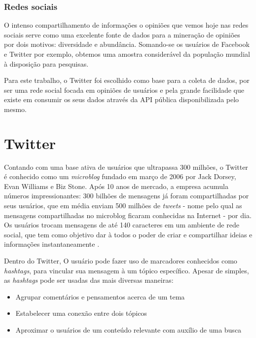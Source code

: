 \subsubsection{Redes sociais}

O intenso compartilhamento de informações o opiniões que vemos hoje nas redes sociais serve como uma excelente fonte de dados para a mineração de opiniões por dois motivos: diversidade e abundância. Somando-se os usuários de Facebook e Twitter por exemplo, obtemos uma amostra considerável da população mundial à disposição para pesquisas.

Para este trabalho, o Twitter foi escolhido como base para a coleta de dados, por ser uma rede social focada em opiniões de usuários e pela grande facilidade que existe em consumir os seus dados através da API pública disponibilizada pelo mesmo.

\section{Twitter}\label{sec:twitter}

Contando com uma base ativa de usuários que ultrapassa 300 milhões\cite{twittercompany2016}, o Twitter é conhecido como um \emph{microblog} fundado em março de 2006 por Jack Dorsey, Evan Williams e Biz Stone. Após 10 anos de mercado, a empresa acumula números impressionantes: 300 bilhões de mensagens já foram compartilhadas por seus usuários, que em média enviam 500 milhões de \emph{tweets}\cite{twitterstats2016} - nome pelo qual as mensagens compartilhadas no microblog ficaram conhecidas na Internet - por dia. Os usuários trocam mensagens de até 140 caracteres\cite{twittercharlimit2016} em um ambiente de rede social, que tem como objetivo dar à todos o poder de criar e compartilhar ideias e informações instantaneamente \cite{twittercompany2016}. 

Dentro do Twitter, O usuário pode fazer uso de marcadores conhecidos como \emph{hashtags}\cite{waite2012paperback}, para vincular sua mensagem à um tópico específico. Apesar de simples, as \emph{hashtags} pode ser usadas das mais diversas maneiras:
\begin{itemize}
\item Agrupar comentários e pensamentos acerca de um tema
\item Estabelecer uma conexão entre dois tópicos
\item Aproximar o usuários de um conteúdo relevante com auxílio de uma busca
\end{itemize}

